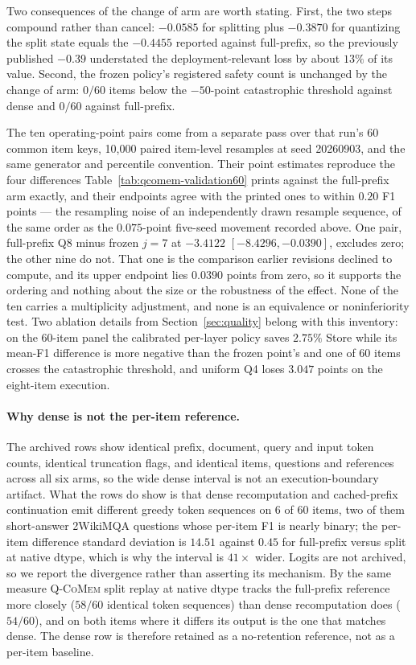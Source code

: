 \documentclass{article}
\newcommand{\qcomem}{\textsc{Q-CoMem}}
\begin{document}
Two consequences of the change of arm are worth stating.  First, the two steps
compound rather than cancel: $-0.0585$ for splitting plus $-0.3870$ for
quantizing the split state equals the $-0.4455$ reported against full-prefix,
so the previously published $-0.39$ understated the deployment-relevant loss by
about $13\%$ of its value.  Second, the frozen policy's registered safety count
is unchanged by the change of arm: $0/60$ items below the $-50$-point
catastrophic threshold against dense and $0/60$ against full-prefix.

The ten operating-point pairs come from a separate pass over that run's 60
common item keys, 10,000 paired item-level resamples at seed 20260903, and the
same generator and percentile convention.  Their point estimates reproduce the
four differences Table~\ref{tab:qcomem-validation60} prints against the
full-prefix arm exactly, and their endpoints agree with the printed ones to
within $0.20$ F1 points --- the resampling noise of an independently drawn
resample sequence, of the same order as the $0.075$-point five-seed movement
recorded above.  One pair, full-prefix Q8 minus frozen $j=7$ at $-3.4122$
$[-8.4296,-0.0390]$, excludes zero; the other nine do not.  That one is the
comparison earlier revisions declined to compute, and its upper endpoint lies
$0.0390$ points from zero, so it supports the ordering and nothing about the
size or the robustness of the effect.  None of the ten carries a multiplicity
adjustment, and none is an equivalence or noninferiority test.
Two ablation details from Section~\ref{sec:quality} belong with this inventory:
on the 60-item panel the calibrated per-layer policy saves $2.75\%$ Store while
its mean-F1 difference is more negative than the frozen point's and one of 60
items crosses the catastrophic threshold, and uniform Q4 loses $3.047$ points on
the eight-item execution.

\paragraph{Why dense is not the per-item reference.}
The archived rows show identical prefix, document, query and input token
counts, identical truncation flags, and identical items, questions and
references across all six arms, so the wide dense interval is not an
execution-boundary artifact.  What the rows do show is that dense
recomputation and cached-prefix continuation emit different greedy token
sequences on 6 of 60 items, two of them short-answer 2WikiMQA questions whose
per-item F1 is nearly binary; the per-item difference standard deviation is
$14.51$ against $0.45$ for full-prefix versus split at native dtype, which is why the
interval is $41\times$ wider.  Logits are not archived, so we report the
divergence rather than asserting its mechanism.  By the same measure
\qcomem{} split replay at native dtype tracks the full-prefix reference more closely ($58/60$ identical
token sequences) than dense recomputation does ($54/60$), and on both items
where it differs its output is the one that matches dense.  The dense row is
therefore retained as a no-retention reference, not as a per-item baseline.
\end{document}
